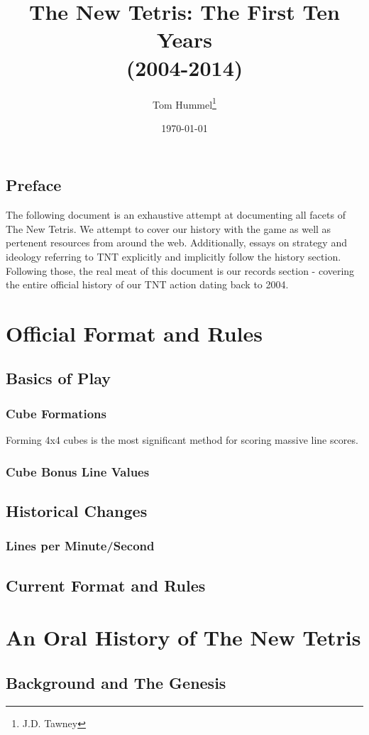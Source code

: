\documentclass[a4paper,twoside,titlepage]{book}
\title{The New Tetris: The First Ten Years 
\\(2004-2014)}
\author{Tom Hummel\thanks{J.D. Tawney}}
\date{\today}
\begin{document}
  \maketitle
  \tableofcontents
  \newpage
    \chapter{Preface}The following document is an exhaustive attempt at documenting all facets of The New Tetris. We attempt to cover our history with the game as well as pertenent resources from around the web. Additionally, essays on strategy and ideology referring to TNT explicitly and implicitly follow the history section. Following those, the real meat of this document is our records section - covering the entire official history of our TNT action dating back to 2004.
  \part{Official Format and Rules}
    \chapter{Basics of Play}
      \section{Cube Formations}Forming 4x4 cubes is the most significant method for scoring massive line scores. 
      \section{Cube Bonus Line Values}
    \chapter{Historical Changes}
      \section{Lines per Minute/Second}
    \chapter{Current Format and Rules}
  \part{An Oral History of The New Tetris}
    \chapter{Background and The Genesis}
\end{document}
